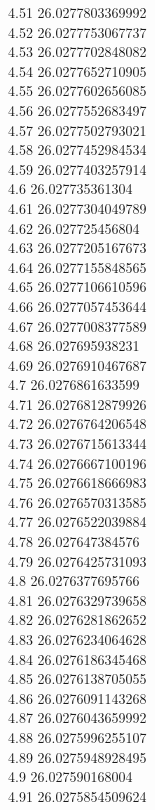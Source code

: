 {4.51	26.0277803369992\\
4.52	26.0277753067737\\
4.53	26.0277702848082\\
4.54	26.0277652710905\\
4.55	26.0277602656085\\
4.56	26.0277552683497\\
4.57	26.0277502793021\\
4.58	26.0277452984534\\
4.59	26.0277403257914\\
4.6	26.027735361304\\
4.61	26.0277304049789\\
4.62	26.027725456804\\
4.63	26.0277205167673\\
4.64	26.0277155848565\\
4.65	26.0277106610596\\
4.66	26.0277057453644\\
4.67	26.0277008377589\\
4.68	26.027695938231\\
4.69	26.0276910467687\\
4.7	26.0276861633599\\
4.71	26.0276812879926\\
4.72	26.0276764206548\\
4.73	26.0276715613344\\
4.74	26.0276667100196\\
4.75	26.0276618666983\\
4.76	26.0276570313585\\
4.77	26.0276522039884\\
4.78	26.027647384576\\
4.79	26.0276425731093\\
4.8	26.0276377695766\\
4.81	26.0276329739658\\
4.82	26.0276281862652\\
4.83	26.0276234064628\\
4.84	26.0276186345468\\
4.85	26.0276138705055\\
4.86	26.0276091143268\\
4.87	26.0276043659992\\
4.88	26.0275996255107\\
4.89	26.0275948928495\\
4.9	26.027590168004\\
4.91	26.0275854509624\\
}
